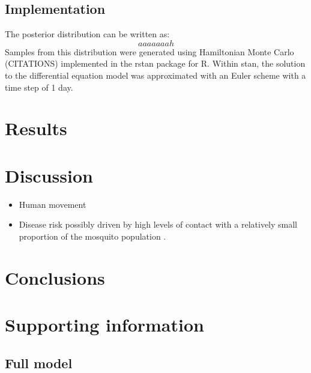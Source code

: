 \documentclass[10pt,letterpaper]{article}
\begin{document}
\subsection*{Implementation}
 
The posterior distribution can be written as:
\begin{equation}
aaaaaaah
\end{equation}
Samples from this distribution were generated using Hamiltonian Monte Carlo (CITATIONS) implemented in the rstan package for R. 
Within stan, the solution to the differential equation model was approximated with an Euler scheme with a time step of 1 day.  


\section*{Results}


\section*{Discussion}

\begin{itemize}
\item Human movement \cite{Adams2009, Cosner2009a, Stoddard2009, Dalziel2013}
\item Disease risk possibly driven by high levels of contact with a relatively small proportion of the mosquito population \cite{Canyon1999}.

\end{itemize}

\section*{Conclusions}

\section*{Supporting information}

\subsection*{Full model}
\end{document}
